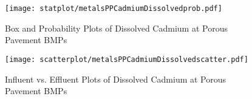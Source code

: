        \begin{figure}[hb]   %
            \centering
            \texttt{[image: statplot/metalsPPCadmiumDissolvedprob.pdf]}
            \caption{Box and Probability Plots of Dissolved Cadmium at Porous Pavement BMPs}
        \end{figure}         %
        
        
        \begin{figure}[hb]   %
            \centering
            \texttt{[image: scatterplot/metalsPPCadmiumDissolvedscatter.pdf]}
            \caption{Influent vs. Effluent Plots of Dissolved Cadmium at Porous Pavement BMPs}
        \end{figure}         %
        \clearpage
        